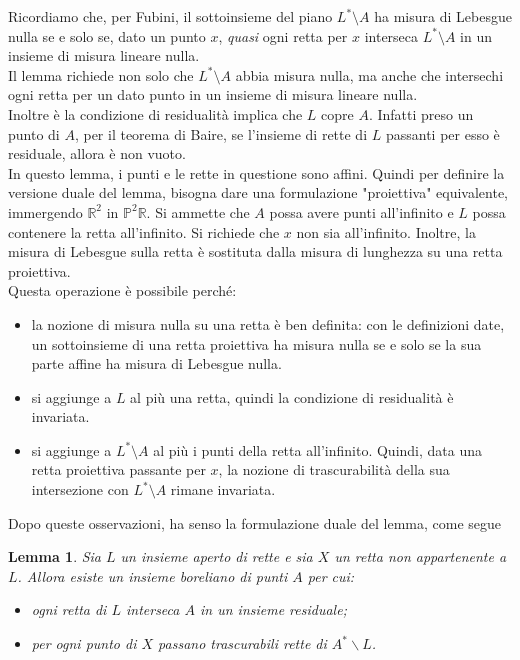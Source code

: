 \documentclass[a4paper, twoside,openright]{article}
\newcommand{\R}{\mathbb{R}}
\renewcommand{\P}{\mathbb{P}}
\newcommand{\<}{\langle}
\renewcommand{\>}{\rangle}
\newtheorem{lemma}[teo]{Lemma}
\begin{document}
Ricordiamo che, per Fubini, il sottoinsieme del piano $L^* \setminus A$ ha misura di Lebesgue nulla se e solo se, dato un punto $x$, \emph{quasi} ogni retta per $x$ interseca $L^* \setminus A$ in un insieme di misura lineare nulla.\\
Il lemma richiede non solo che $L^* \setminus A$ abbia misura nulla, ma anche che intersechi ogni retta per un dato punto in un insieme di misura lineare nulla. \\
Inoltre è la condizione di residualità implica che $L$ copre $A$. Infatti preso un punto di $A$, per il teorema di Baire, se l'insieme di rette di $L$ passanti per esso è residuale, allora è non vuoto.\\

In questo lemma, i punti e le rette in questione sono affini. Quindi per definire la versione duale del lemma, bisogna dare una formulazione "proiettiva" equivalente, immergendo $\R^2$ in $\P^2\R$. Si ammette che $A$ possa avere punti all'infinito e $L$ possa contenere la retta all'infinito. Si richiede che $x$ non sia all'infinito. Inoltre, la misura di Lebesgue sulla retta è sostituta dalla misura di lunghezza su una retta proiettiva.\\
Questa operazione è possibile perché:\\
\begin{itemize}
	\item la nozione di misura nulla su una retta è ben definita: con le definizioni date, un sottoinsieme di una retta proiettiva ha misura nulla se e solo se la sua parte affine ha misura di Lebesgue nulla. 
	\item si aggiunge a $L$ al più una retta, quindi la condizione di residualità è invariata.
	\item si aggiunge a $L^* \setminus A$ al più i punti della retta all'infinito. Quindi, data una retta proiettiva passante per $x$, la nozione di trascurabilità della sua intersezione con $L^* \setminus A$ rimane invariata.
\end{itemize}
Dopo queste osservazioni, ha senso la formulazione duale del lemma, come segue 

\begin{lemma} \label{lemma2}
Sia $L$ un insieme aperto di rette e sia $X$ un retta non appartenente a $L$. Allora esiste un insieme boreliano di punti $A$ per cui:

\begin{itemize}
	\item ogni retta di $L$ interseca $A$ in un insieme residuale;
	\item per ogni punto di $X$ passano trascurabili rette di $A^{*} \backslash L$.
\end{itemize}
\end{lemma}
\end{document}
